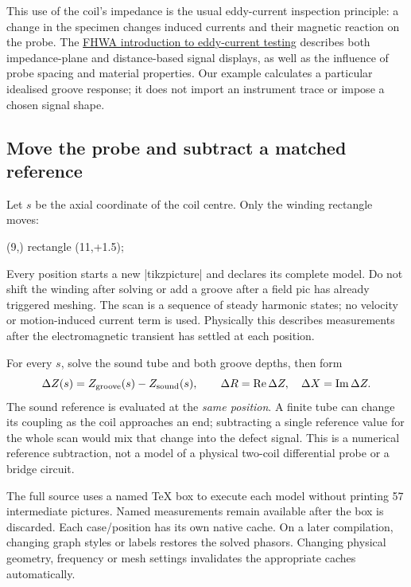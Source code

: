 This use of the coil's impedance is the usual eddy-current inspection
principle: a change in the specimen changes induced currents and their
magnetic reaction on the probe. The
\href{https://infotechnology.fhwa.dot.gov/eddy-current-testing/}{FHWA introduction
to eddy-current testing} describes both impedance-plane and distance-based
signal displays, as well as the influence of probe spacing and material
properties. Our example calculates a particular idealised groove response;
it does not import an instrument trace or impose a chosen signal shape.

\subsection{Move the probe and subtract a matched reference}
Let $s$ be the axial coordinate of the coil centre. Only the winding rectangle
moves:
\begin{codeexample}
\path[femm/region={material=copper,circuit=probe,turns=60,
  winding fill=.6,mesh size=\Mesh}]
  (9,{}) rectangle (11,{\Position+1.5});
\femmmeasure[name=\Case-\Index,quantity=circuit,circuit=probe,
  parameter=\Position]
\end{codeexample}
Every position starts a new |tikzpicture| and declares its complete model.
Do not shift the winding after solving or add a groove after a field pic has
already triggered meshing. The scan is a sequence of steady harmonic states;
no velocity or motion-induced current term is used. Physically this describes
measurements after the electromagnetic transient has settled at each position.

For every $s$, solve the sound tube and both groove depths, then form
\[
 \Delta Z(s)=Z_{\rm groove}(s)-Z_{\rm sound}(s),\qquad
 \Delta R=\mathop{\rm Re}\Delta Z,\quad
 \Delta X=\mathop{\rm Im}\Delta Z.
\]
The sound reference is evaluated at the \emph{same position}. A finite tube
can change its coupling as the coil approaches an end; subtracting a single
reference value for the whole scan would mix that change into the defect
signal. This is a numerical reference subtraction, not a model of a physical
two-coil differential probe or a bridge circuit.

The full source uses a named TeX box to execute each model without printing
57 intermediate pictures. Named measurements remain available after the box
is discarded. Each case/position has its own native cache. On a later
compilation, changing graph styles or labels restores the solved phasors.
Changing physical geometry, frequency or mesh settings invalidates the
appropriate caches automatically.

